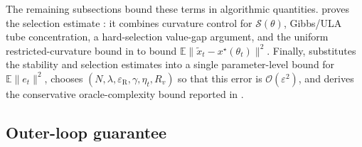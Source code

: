 \documentclass{article}
\theoremstyle{normaltheorem}
\newcommand{\calS}{\mathcal{S}}
\begin{document}
The remaining subsections bound these terms in algorithmic quantities. 
 proves the selection estimate : it combines curvature control for \(\calS(\theta)\), Gibbs/ULA tube concentration, a hard-selection value-gap argument, and the uniform restricted-curvature bound in  to bound \(\mathbb E\|\tilde x_t-x^\star(\theta_t)\|^2\). 
Finally,  substitutes the stability and selection estimates into a single parameter-level bound for \(\mathbb E\|e_t\|^2\), chooses \((N,\lambda,\varepsilon_{\mathrm R},\gamma,\eta_t,R_v)\) so that this error is \(\mathcal{O}(\varepsilon^2)\), and derives the conservative oracle-complexity bound reported in .


\subsection{Outer-loop guarantee}\label{append_outer_loop_proof}
\end{document}
